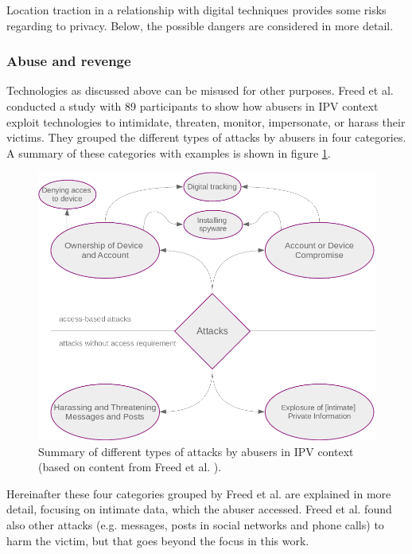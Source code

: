 
Location traction in a relationship with digital techniques provides some risks regarding to privacy. Below, the possible dangers are considered in more detail.

\subsubsection{Abuse and revenge}
Technologies as discussed above can be misused for other purposes. Freed et al. \cite{freed2018stalker} conducted a study with 89 participants to show how abusers in \ac{IPV} context exploit technologies to intimidate, threaten, monitor, impersonate, or harass their victims.
They grouped the different types of attacks by abusers in four categories. A summary of these categories with examples is shown in figure \ref{fig:abusing_categories}.

\begin{figure}[htb]
	\centering
	\includegraphics[width=\linewidth]{img/abusing_categories.png}
	\caption{Summary of different types of attacks by abusers in \acl{IPV} context (based on content from Freed et al. \cite{freed2018stalker}).}
	\label{fig:abusing_categories}
\end{figure}
Hereinafter these four categories grouped by Freed et al. \cite{freed2018stalker} are explained in more detail, focusing on intimate data, which the abuser accessed. Freed et al. found also other attacks (e.g. messages, posts in social networks and phone calls) to harm the victim, but that goes beyond the focus in this work.

